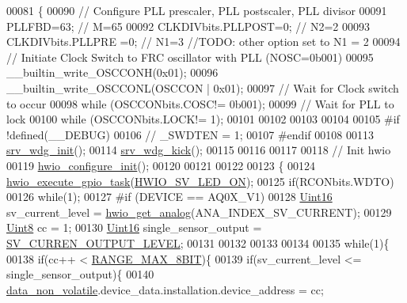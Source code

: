 \begin{DoxyCode}
00081 \{
00090 \textcolor{comment}{// Configure PLL prescaler, PLL postscaler, PLL divisor}
00091 PLLFBD=63;                                           \textcolor{comment}{// M=65}
00092 CLKDIVbits.PLLPOST=0;                                \textcolor{comment}{// N2=2}
00093 CLKDIVbits.PLLPRE =0;                                \textcolor{comment}{// N1=3 //TODO: other option set to N1 = 2}
00094 \textcolor{comment}{// Initiate Clock Switch to FRC oscillator with PLL (NOSC=0b001)}
00095 \_\_builtin\_write\_OSCCONH(0x01);
00096 \_\_builtin\_write\_OSCCONL(OSCCON | 0x01);
00097 \textcolor{comment}{// Wait for Clock switch to occur}
00098 \textcolor{keywordflow}{while} (OSCCONbits.COSC!= 0b001);
00099 \textcolor{comment}{// Wait for PLL to lock}
00100 \textcolor{keywordflow}{while} (OSCCONbits.LOCK!= 1);
00101 
00102 
00103 
00104 
00105 \textcolor{preprocessor}{#if !defined(\_\_DEBUG)}
00106    \textcolor{comment}{// \_SWDTEN = 1;}
00107 \textcolor{preprocessor}{#endif}
00108 
00113     \hyperlink{a00067_a8a83a885a73db05d7faa34734d132644}{srv\_wdg\_init}();
00114     \hyperlink{a00067_a710d148845397582739d170341f3d3d9}{srv\_wdg\_kick}();
00115         
00116 
00117   
00118     \textcolor{comment}{// Init hwio}
00119     \hyperlink{a00058_a46e02bcdf3bfe45545879afb71919d47}{hwio\_configure\_init}();
00120     
00121 
00122 
00123     \{
00124     \hyperlink{a00058_a0af9eae455fbdf4e77def5bfffa109cb}{hwio\_execute\_gpio\_task}(\hyperlink{a00058_aae186cdf37c0783bf64b0aed3f1e6eda}{HWIO\_SV\_LED\_ON});
00125     \textcolor{keywordflow}{if}(RCONbits.WDTO)
00126         \textcolor{keywordflow}{while}(1);
00127 \textcolor{preprocessor}{     #if (DEVICE == AQ0X\_V1)}
00128     \hyperlink{a00072_a59a9f6be4562c327cbfb4f7e8e18f08b}{Uint16} sv\_current\_level = \hyperlink{a00058_a5770775aca185380868838e69ec20215}{hwio\_get\_analog}(ANA\_INDEX\_SV\_CURRENT);
00129     \hyperlink{a00072_af84840501dec18061d18a68c162a8fa2}{Uint8}  cc = 1;
00130     \hyperlink{a00072_a59a9f6be4562c327cbfb4f7e8e18f08b}{Uint16} single\_sensor\_output =  \hyperlink{a00021_a648a6327bd26d3d2f537bbea230c6ffb}{SV\_CURREN\_OUTPUT\_LEVEL};
00131 
00132 
00133 
00134    
00135             \textcolor{keywordflow}{while}(1)\{
00138                  \textcolor{keywordflow}{if}(cc++ < \hyperlink{a00021_ae0c75a1cb44e5d3f00ec7c9e40acfda8}{RANGE\_MAX\_8BIT})\{
00139                      \textcolor{keywordflow}{if}(sv\_current\_level <= single\_sensor\_output)\{
00140                          \hyperlink{a00060_a76ac5f917f5308dcd83de0d7c94559fb}{data\_non\_volatile}.device\_data.installation.device\_address = cc;

\end{DoxyCode}
